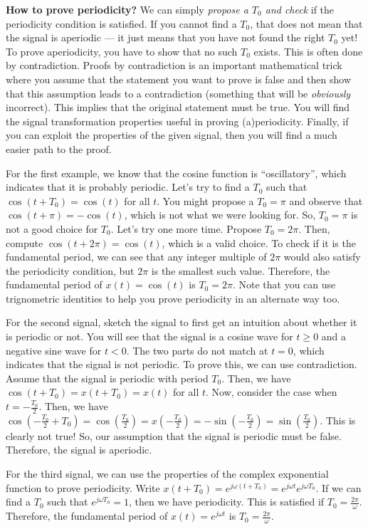 \documentclass{ee102_notes}
\begin{document}
\textbf{How to prove periodicity?} We can simply \emph{propose a $T_0$ and check} if the periodicity condition is satisfied. If you cannot find a $T_0$, that does not mean that the signal is aperiodic --- it just means that you have not found the right $T_0$ yet! To prove aperiodicity, you have to show that no such $T_0$ exists. This is often done by contradiction. Proofs by contradiction is an important mathematical trick where you assume that the statement you want to prove is false and then show that this assumption leads to a contradiction (something that will be \emph{obviously} incorrect). This implies that the original statement must be true. You will find the signal transformation properties useful in proving (a)periodicity. Finally, if you can exploit the properties of the given signal, then you will find a much easier path to the proof.

For the first example, we know that the cosine function is ``oscillatory'', which indicates that it is probably periodic. Let's try to find a $T_0$ such that $\cos(t + T_0) = \cos(t)$ for all $t$. You might propose a $T_0 = \pi$ and observe that $\cos(t + \pi) = -\cos(t)$, which is not what we were looking for. So, $T_0 = \pi$ is not a good choice for $T_0$. Let's try one more time. Propose $T_0 = 2\pi$. Then, compute $\cos(t + 2\pi) = \cos(t)$, which is a valid choice. To check if it is the fundamental period, we can see that any integer multiple of $2\pi$ would also satisfy the periodicity condition, but $2\pi$ is the smallest such value. Therefore, the fundamental period of $x(t) = \cos(t)$ is $T_0 = 2\pi$. Note that you can use trignometric identities to help you prove periodicity in an alternate way too.

For the second signal, sketch the signal to first get an intuition about whether it is periodic or not. You will see that the signal is a cosine wave for $t \geq 0$ and a negative sine wave for $t < 0$. The two parts do not match at $t = 0$, which indicates that the signal is not periodic. To prove this, we can use contradiction. Assume that the signal is periodic with period $T_0$. Then, we have $\cos(t + T_0) = x(t + T_0) = x(t)$ for all $t$. Now, consider the case when $t = -\frac{T_0}{2}$. Then, we have $\cos(-\frac{T_0}{2} + T_0) = \cos(\frac{T_0}{2}) = x(-\frac{T_0}{2}) = -\sin(-\frac{T_0}{2}) = \sin(\frac{T_0}{2})$. This is clearly not true! So, our assumption that the signal is periodic must be false. Therefore, the signal is aperiodic.

For the third signal, we can use the properties of the complex exponential function to prove periodicity. Write $x(t + T_0) = e^{j\omega(t + T_0)} = e^{j\omega t}e^{j\omega T_0}$. If we can find a $T_0$ such that $e^{j\omega T_0} = 1$, then we have periodicity. This is satisfied if $T_0 = \frac{2\pi}{\omega}$. Therefore, the fundamental period of $x(t) = e^{j\omega t}$ is $T_0 = \frac{2\pi}{\omega}$.
\end{document}
